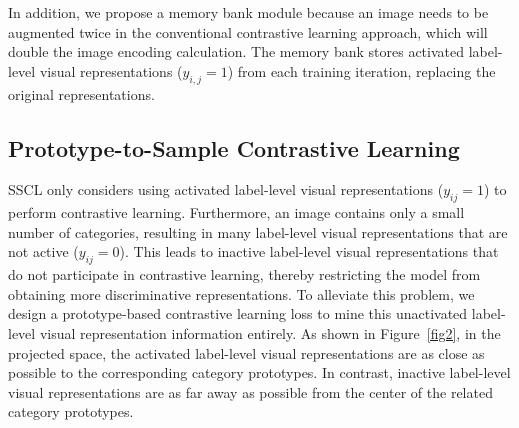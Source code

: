 \documentclass{ecai}
\begin{document}
In addition, we propose a memory bank module because an image needs to be augmented twice in the conventional contrastive learning approach, which will double the image encoding calculation.
The memory bank stores activated label-level visual representations ($y_{i,j}\!=\!1$) from each training iteration, replacing the original representations.	



\subsection{Prototype-to-Sample Contrastive Learning}
\label{PSCL}
SSCL only considers using activated label-level visual representations ($y_{ij}\!=\!1$) to perform contrastive learning. Furthermore, an image contains only a small number of categories, resulting in many label-level visual representations that are not active ($y_{ij}\!=\!0$).
This leads to inactive label-level visual representations that do not participate in contrastive learning, thereby restricting the model from obtaining more discriminative representations.
To alleviate this problem, we design a prototype-based contrastive learning loss to mine this unactivated label-level visual representation information entirely. As shown in Figure~\ref{fig2}, in the projected space, the activated label-level visual representations are as close as possible to the corresponding category prototypes. In contrast, inactive label-level visual representations are as far away as possible from the center of the related category prototypes. 
\end{document}
